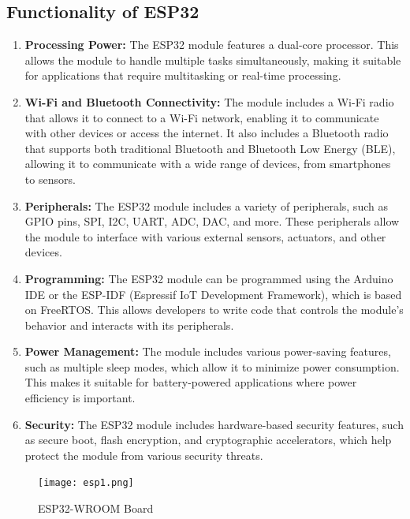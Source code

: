\documentclass[a4paper]{report}
\begin{document}
{\subsection{Functionality of ESP32}
\begin{enumerate}[label=\arabic*)]
    \item \textbf{Processing Power:} 
    The ESP32 module features a dual-core processor. This allows the module to handle multiple tasks simultaneously, making it suitable for applications that require multitasking or real-time processing.
    
    \item \textbf{Wi-Fi and Bluetooth Connectivity:} 
    The module includes a Wi-Fi radio that allows it to connect to a Wi-Fi network, enabling it to communicate with other devices or access the internet. It also includes a Bluetooth radio that supports both traditional Bluetooth and Bluetooth Low Energy (BLE), allowing it to communicate with a wide range of devices, from smartphones to sensors.
    
    \item \textbf{Peripherals:} 
    The ESP32 module includes a variety of peripherals, such as GPIO pins, SPI, I2C, UART, ADC, DAC, and more. These peripherals allow the module to interface with various external sensors, actuators, and other devices.
    
    \item \textbf{Programming:} 
    The ESP32 module can be programmed using the Arduino IDE or the ESP-IDF (Espressif IoT Development Framework), which is based on FreeRTOS. This allows developers to write code that controls the module's behavior and interacts with its peripherals.
    
    \item \textbf{Power Management:} 
    The module includes various power-saving features, such as multiple sleep modes, which allow it to minimize power consumption. This makes it suitable for battery-powered applications where power efficiency is important.
    
    \item \textbf{Security:} 
    The ESP32 module includes hardware-based security features, such as secure boot, flash encryption, and cryptographic accelerators, which help protect the module from various security threats.
\end{enumerate}

\begin{figure}[H]
    \centering
    \texttt{[image: esp1.png]}
    \caption{ESP32-WROOM Board}
    \label{fig:enter-label}
\end{figure}
}
\end{document}
